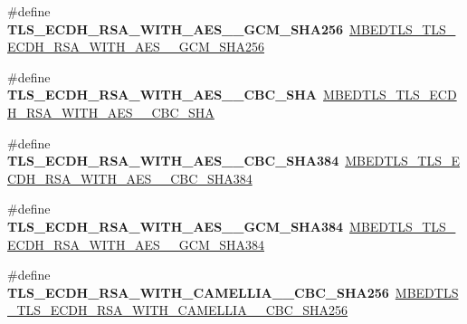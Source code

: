 \begin{DoxyCompactItemize}
\mbox{\label{compat-1_83_8h_a616422519509b4a667e98a1e4dbfebc8}} 
\#define {\bfseries T\+L\+S\+\_\+\+E\+C\+D\+H\+\_\+\+R\+S\+A\+\_\+\+W\+I\+T\+H\+\_\+\+A\+E\+S\+\_\+\_\+\+G\+C\+M\+\_\+\+S\+H\+A256}~\mbox{\hyperlink{ssl__ciphersuites_8h_a44278d5b600a19e7257a4d6d4c3fcc3c}{M\+B\+E\+D\+T\+L\+S\+\_\+\+T\+L\+S\+\_\+\+E\+C\+D\+H\+\_\+\+R\+S\+A\+\_\+\+W\+I\+T\+H\+\_\+\+A\+E\+S\+\_\+\_\+\+G\+C\+M\+\_\+\+S\+H\+A256}}
\item 
\mbox{\label{compat-1_83_8h_a82177482378436bd1be8a62bb003f7de}} 
\#define {\bfseries T\+L\+S\+\_\+\+E\+C\+D\+H\+\_\+\+R\+S\+A\+\_\+\+W\+I\+T\+H\+\_\+\+A\+E\+S\+\_\+\_\+\+C\+B\+C\+\_\+\+S\+HA}~\mbox{\hyperlink{ssl__ciphersuites_8h_a81461d59d23becd836c6a80bf9a6d1cf}{M\+B\+E\+D\+T\+L\+S\+\_\+\+T\+L\+S\+\_\+\+E\+C\+D\+H\+\_\+\+R\+S\+A\+\_\+\+W\+I\+T\+H\+\_\+\+A\+E\+S\+\_\+\_\+\+C\+B\+C\+\_\+\+S\+HA}}
\item 
\mbox{\label{compat-1_83_8h_afd26d3c412c9b7a99d9b15fdc78a67eb}} 
\#define {\bfseries T\+L\+S\+\_\+\+E\+C\+D\+H\+\_\+\+R\+S\+A\+\_\+\+W\+I\+T\+H\+\_\+\+A\+E\+S\+\_\+\_\+\+C\+B\+C\+\_\+\+S\+H\+A384}~\mbox{\hyperlink{ssl__ciphersuites_8h_a47e26eaa7be9c306df31bbbe97f9053d}{M\+B\+E\+D\+T\+L\+S\+\_\+\+T\+L\+S\+\_\+\+E\+C\+D\+H\+\_\+\+R\+S\+A\+\_\+\+W\+I\+T\+H\+\_\+\+A\+E\+S\+\_\+\_\+\+C\+B\+C\+\_\+\+S\+H\+A384}}
\item 
\mbox{\label{compat-1_83_8h_ade1889f8b954d53bc910e1e016679d39}} 
\#define {\bfseries T\+L\+S\+\_\+\+E\+C\+D\+H\+\_\+\+R\+S\+A\+\_\+\+W\+I\+T\+H\+\_\+\+A\+E\+S\+\_\+\_\+\+G\+C\+M\+\_\+\+S\+H\+A384}~\mbox{\hyperlink{ssl__ciphersuites_8h_aa3b28cdb1e1e0b0b8a7c91546ccbdd64}{M\+B\+E\+D\+T\+L\+S\+\_\+\+T\+L\+S\+\_\+\+E\+C\+D\+H\+\_\+\+R\+S\+A\+\_\+\+W\+I\+T\+H\+\_\+\+A\+E\+S\+\_\+\_\+\+G\+C\+M\+\_\+\+S\+H\+A384}}
\item 
\mbox{\label{compat-1_83_8h_ac4a3fbbc789b041b9ee72cf931237a7a}} 
\#define {\bfseries T\+L\+S\+\_\+\+E\+C\+D\+H\+\_\+\+R\+S\+A\+\_\+\+W\+I\+T\+H\+\_\+\+C\+A\+M\+E\+L\+L\+I\+A\+\_\+\_\+\+C\+B\+C\+\_\+\+S\+H\+A256}~\mbox{\hyperlink{ssl__ciphersuites_8h_a241fb84d48131e45e80eb4cd05ef1b69}{M\+B\+E\+D\+T\+L\+S\+\_\+\+T\+L\+S\+\_\+\+E\+C\+D\+H\+\_\+\+R\+S\+A\+\_\+\+W\+I\+T\+H\+\_\+\+C\+A\+M\+E\+L\+L\+I\+A\+\_\+\_\+\+C\+B\+C\+\_\+\+S\+H\+A256}}

\end{DoxyCompactItemize}
